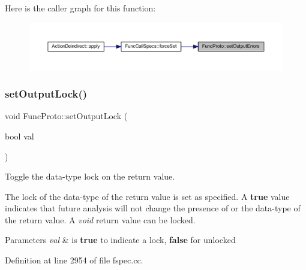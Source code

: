 Here is the caller graph for this function\+:
\nopagebreak
\begin{figure}[H]
\begin{center}
\leavevmode
\includegraphics[width=350pt]{class_func_proto_ac8eacd70fbc6e4cd5d694d2ae5b1ed64_icgraph}
\end{center}
\end{figure}
\mbox{\label{class_func_proto_a7593a0880a632bce714a376244ef4f9a}} 
\subsubsection{\texorpdfstring{setOutputLock()}{setOutputLock()}}
{\footnotesize\ttfamily void Func\+Proto\+::set\+Output\+Lock (\begin{DoxyParamCaption}\item[{bool}]{val }\end{DoxyParamCaption})}



Toggle the data-\/type lock on the return value. 

The lock of the data-\/type of the return value is set as specified. A {\bfseries{true}} value indicates that future analysis will not change the presence of or the data-\/type of the return value. A {\itshape void} return value can be locked. 
\begin{DoxyParams}{Parameters}
{\em val} & is {\bfseries{true}} to indicate a lock, {\bfseries{false}} for unlocked \\
\hline
\end{DoxyParams}


Definition at line 2954 of file fspec.\+cc.

